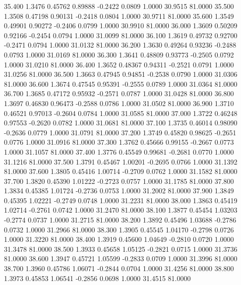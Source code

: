   35.400   1.3476   0.45762   0.89888  -0.2422   0.0809   1.0000  30.9515  81.0000
  35.500   1.3508   0.47198   0.90131  -0.2418   0.0804   1.0000  30.9711  81.0000
  35.600   1.3549   0.49901   0.90272  -0.2406   0.0799   1.0000  30.9910  81.0000
  36.000   1.3609   0.50209   0.92166  -0.2454   0.0794   1.0000  31.0099  81.0000
  36.100   1.3619   0.49732   0.92700  -0.2471   0.0794   1.0000  31.0132  81.0000
  36.200   1.3630   0.49264   0.93236  -0.2488   0.0793   1.0000  31.0169  81.0000
  36.300   1.3641   0.48809   0.93773  -0.2505   0.0792   1.0000  31.0210  81.0000
  36.400   1.3652   0.48367   0.94311  -0.2521   0.0791   1.0000  31.0256  81.0000
  36.500   1.3663   0.47945   0.94851  -0.2538   0.0790   1.0000  31.0306  81.0000
  36.600   1.3674   0.47545   0.95391  -0.2555   0.0789   1.0000  31.0364  81.0000
  36.700   1.3685   0.47172   0.95932  -0.2571   0.0787   1.0000  31.0428  81.0000
  36.800   1.3697   0.46830   0.96473  -0.2588   0.0786   1.0000  31.0502  81.0000
  36.900   1.3710   0.46521   0.97013  -0.2604   0.0784   1.0000  31.0585  81.0000
  37.000   1.3722   0.46248   0.97553  -0.2620   0.0782   1.0000  31.0681  81.0000
  37.100   1.3735   0.46014   0.98090  -0.2636   0.0779   1.0000  31.0791  81.0000
  37.200   1.3749   0.45820   0.98625  -0.2651   0.0776   1.0000  31.0916  81.0000
  37.300   1.3762   0.45666   0.99155  -0.2667   0.0773   1.0000  31.1057  81.0000
  37.400   1.3776   0.45549   0.99681  -0.2681   0.0770   1.0000  31.1216  81.0000
  37.500   1.3791   0.45467   1.00201  -0.2695   0.0766   1.0000  31.1392  81.0000
  37.600   1.3805   0.45416   1.00714  -0.2709   0.0762   1.0000  31.1582  81.0000
  37.700   1.3820   0.45390   1.01222  -0.2723   0.0757   1.0000  31.1785  81.0000
  37.800   1.3834   0.45385   1.01724  -0.2736   0.0753   1.0000  31.2002  81.0000
  37.900   1.3849   0.45395   1.02221  -0.2749   0.0748   1.0000  31.2231  81.0000
  38.000   1.3863   0.45419   1.02714  -0.2761   0.0742   1.0000  31.2470  81.0000
  38.100   1.3877   0.45454   1.03203  -0.2774   0.0737   1.0000  31.2715  81.0000
  38.200   1.3892   0.45496   1.03688  -0.2786   0.0732   1.0000  31.2966  81.0000
  38.300   1.3905   0.45545   1.04170  -0.2798   0.0726   1.0000  31.3220  81.0000
  38.400   1.3919   0.45600   1.04649  -0.2810   0.0720   1.0000  31.3478  81.0000
  38.500   1.3933   0.45658   1.05125  -0.2821   0.0715   1.0000  31.3736  81.0000
  38.600   1.3947   0.45721   1.05599  -0.2833   0.0709   1.0000  31.3996  81.0000
  38.700   1.3960   0.45786   1.06071  -0.2844   0.0704   1.0000  31.4256  81.0000
  38.800   1.3973   0.45853   1.06541  -0.2856   0.0698   1.0000  31.4515  81.0000

